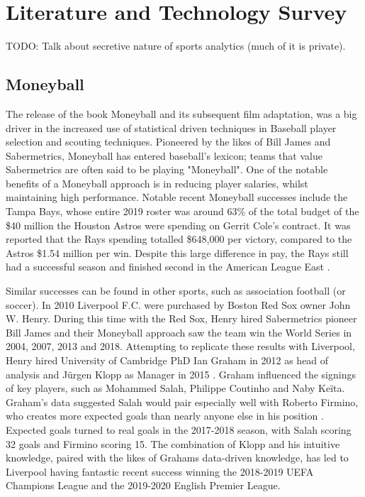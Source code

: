 \documentclass[12pt,a4paper]{report}
\theoremstyle{definition}
\begin{document}
\chapter{Literature and Technology Survey}

TODO: Talk about secretive nature of sports analytics (much of it is private).

\section{Moneyball}

The release of the book Moneyball \citep{Moneyball2004} and its subsequent film adaptation, was a big driver in the increased use of statistical driven techniques in Baseball player selection and scouting techniques. 
Pioneered by the likes of Bill James and Sabermetrics, Moneyball has entered baseball's lexicon; teams that value Sabermetrics are often said to be playing "Moneyball".  
One of the notable benefits of a Moneyball approach is in reducing player salaries, whilst maintaining high performance. 
Notable recent Moneyball successes include the Tampa Bays, whose entire 2019 roster was around 63\% of the total budget of the \$40 million the Houston Astros were spending on Gerrit Cole's contract. 
It was reported that the Rays spending totalled \$648,000 per victory, compared to the Astros \$1.54 million per win.
Despite this large difference in pay, the Rays still had a successful season and finished second in the American League East \citep{Fox2019}.

Similar successes can be found in other sports, such as association football (or soccer). 
In 2010 Liverpool F.C. were purchased by Boston Red Sox owner John W. Henry. 
During this time with the Red Sox, Henry hired Sabermetrics pioneer Bill James and their Moneyball approach saw the team win the World Series in 2004, 2007, 2013 and 2018. 
Attempting to replicate these results with Liverpool, Henry hired University of Cambridge PhD Ian Graham in 2012 as head of analysis and J\"urgen Klopp as Manager in 2015 \citep{Liverpool2022}. 
Graham influenced the signings of key players, such as Mohammed Salah, Philippe Coutinho and Naby Ke\"ita. 
Graham's data suggested Salah would pair especially well with Roberto Firmino, who creates more expected goals than nearly anyone else in his position \citep{Liverpool2019}. 
Expected goals turned to real goals in the 2017-2018 season, with Salah scoring 32 goals and Firmino scoring 15. 
The combination of Klopp and his intuitive knowledge, paired with the likes of Grahams data-driven knowledge, has led to Liverpool having fantastic recent success winning the 2018-2019 UEFA Champions League and the 2019-2020 English Premier League.
\end{document}
